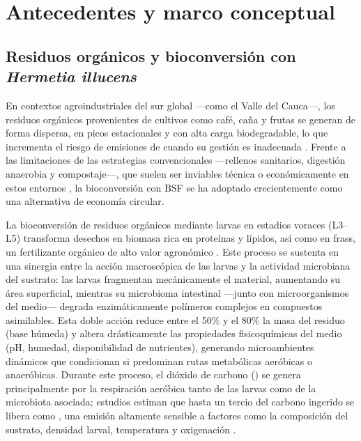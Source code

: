 \section{Antecedentes y marco conceptual}

\subsection{Residuos orgánicos y bioconversión con \textit{Hermetia illucens}}

En contextos agroindustriales del sur global ---como el Valle del Cauca---, los residuos orgánicos provenientes de cultivos como café, caña y frutas se generan de forma dispersa, en picos estacionales y con alta carga biodegradable, lo que incrementa el riesgo de emisiones de  cuando su gestión es inadecuada \cite{lacknerAgriculturalWasteChallenges2025, leddinImpactClimateChange2024a}. Frente a las limitaciones de las estrategias convencionales ---rellenos sanitarios, digestión anaerobia y compostaje---, que suelen ser inviables técnica o económicamente en estos entornos \cite{kongEvaluatingGreenhouseGas2012, nordahlGreenhouseGasAir2023a}, la bioconversión con BSF se ha adoptado crecientemente como una alternativa de economía circular.

La bioconversión de residuos orgánicos mediante larvas en estadios voraces (L3--L5) transforma desechos en biomasa rica en proteínas y lípidos, así como en frass, un fertilizante orgánico de alto valor agronómico \cite{bermudez-serranoComprehensiveUtilizationBlack2023, singhInclusiveApproachOrganic2019a, surendraBioconversionOrganicWastes2016}. Este proceso se sustenta en una sinergia entre la acción macroscópica de las larvas y la actividad microbiana del sustrato: las larvas fragmentan mecánicamente el material, aumentando su área superficial, mientras su microbioma intestinal ---junto con microorganismos del medio--- degrada enzimáticamente polímeros complejos en compuestos asimilables. Esta doble acción reduce entre el 50\% y el 80\% la masa del residuo (base húmeda) y altera drásticamente las propiedades fisicoquímicas del medio (pH, humedad, disponibilidad de nutrientes), generando microambientes dinámicos que condicionan si predominan rutas metabólicas aeróbicas o anaeróbicas. Durante este proceso, el dióxido de carbono () se genera principalmente por la respiración aeróbica tanto de las larvas como de la microbiota asociada; estudios estiman que hasta un tercio del carbono ingerido se libera como  \cite{dienerConversionOrganicMaterial2011}, una emisión altamente sensible a factores como la composición del sustrato, densidad larval, temperatura y oxigenación \cite{bekkerImpactSubstrateMoisture2021a, eriksenDynamicModellingFeed2022, rossiEstimatingDynamicsGreenhouse2024a}.

